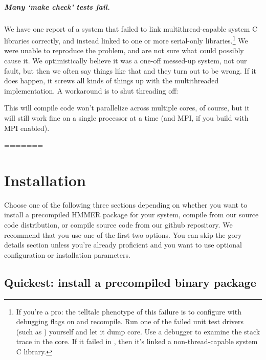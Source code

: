 \paragraph{Many `make check' tests fail.} We have one report of a
system that failed to link multithread-capable system C libraries
correctly, and instead linked to one or more serial-only
libraries.\footnote{If you're a pro: the telltale phenotype of this
  failure is to configure with debugging flags on and recompile. Run
  one of the failed unit test drivers (such as
  ) yourself and let it dump core. Use a
  debugger to examine the stack trace in the core. If it failed in
  , then it's linked a non-thread-capable
  system C library.} We were unable to reproduce the problem, and are
not sure what could possibly cause it. We optimistically believe it
was a one-off messed-up system, not our fault, but then we often say
things like that and they turn out to be wrong. If it does happen, it
screws all kinds of things up with the multithreaded implementation. A
workaround is to shut threading off:

  \vspace{1ex}
  \vspace{1ex}

This will compile code won't parallelize across multiple cores, of
course, but it will still work fine on a single processor at a time
(and MPI, if you build with MPI enabled).

=======
\newpage
\chapter{Installation}
\label{chapter:installation}
\setcounter{footnote}{0}

Choose one of the following three sections depending on whether you
want to install a precompiled HMMER package for your system, compile
from our source code
distribution, or compile
source code from our github
repository.
We recommend that you use one of the first two options.  You can
skip the gory details section unless you're already proficient and you
want to use optional configuration or installation parameters.


\section{Quickest: install a precompiled binary package} 

